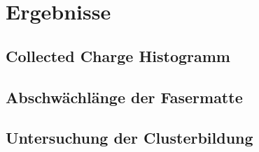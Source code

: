 \chapter{Ergebnisse}
\section{Collected Charge Histogramm}
\section{Abschwächlänge der Fasermatte}
\section{Untersuchung der Clusterbildung}
